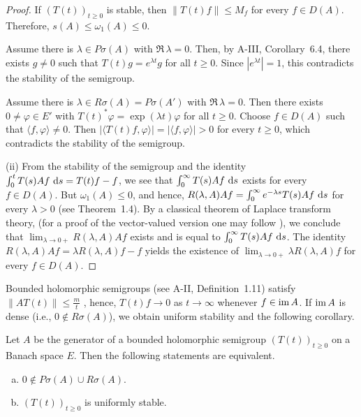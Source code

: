 \begin{proof} If \( (T(t))_{t \geq 0} \) is stable, then \( \|T(t) f\| \leq M_f \) for every \( f \in D(A) \). Therefore, \( s(A) \leq \omega_1(A) \leq 0 \). 

\noindent Assume there is \( \lambda \in P\sigma(A) \) with \( \Re\,\lambda = 0 \). Then, by A-III, Corollary~6.4, there exists \( g \neq 0 \) such that \( T(t) g = e^{\lambda t} g \) for all \( t \geq 0 \). Since \( |e^{\lambda t}| = 1 \), this contradicts the stability of the semigroup. 

\noindent Assume there is \( \lambda \in R\sigma(A) = P\sigma(A') \) with \( \Re\,\lambda = 0 \). Then there exists \( 0 \neq \varphi \in E' \) with \( T(t)^* \varphi = \exp(\lambda t) \varphi \) for all \( t \geq 0 \). Choose \( f \in D(A) \) such that \( \langle f, \varphi \rangle \neq 0 \). Then \( |\langle T(t) f, \varphi \rangle| = | \langle f, \varphi \rangle| > 0 \) for every \( t \geq 0 \), which contradicts the stability of the semigroup.

\medskip
\noindent
(ii) From the stability of the semigroup and the identity   \(\int_{0}^{t} T(s) A f \,\mathop{}\!\mathrm{d}{s} = T(t) f - f\), we see that  
\(\int_{0}^{\infty} T(s) A f \,\mathop{}\!\mathrm{d}{s}\) exists for every \( f \in D(A) \).  
But \( \omega_1(A) \leq 0 \), and hence,  
\( R(\lambda, A) A f = \int_{0}^{\infty} e^{-\lambda s} T(s) A f \,\mathop{}\!\mathrm{d}{s} \) for every \( \lambda > 0 \) (see Theorem~1.4). By a classical theorem of Laplace transform theory, (for a proof of the vector-valued version one may follow \citet[p.196]{widder:1971}), we conclude that $\lim_{\lambda \to 0+} R(\lambda,A)Af$ exists
and is equal to $\int_{0}^{\infty} T(s)Af \,\mathop{}\!\mathrm{d}{s}$. 
The identity $R(\lambda,A)Af = \lambda R(\lambda,A)f - f$
yields the existence of $\lim_{\lambda \to 0+} \lambda R(\lambda,A)f$ for every $f \in D(A)$.
\end{proof}
\noindent
Bounded holomorphic semigroups (see A-II, Definition~1.11) satisfy
$\|AT(t)\| \leq \frac{m}{t}$ \citet[p.33]{goldstein:1985a}, hence, $T(t)f \to 0$ as $t \to \infty$
whenever $f \in \mathop{}\!\mathrm{im}\, A$. 
If $\mathop{}\!\mathrm{im}\, A$ is dense (i.e., $0 \not\in R\sigma(A)$), we obtain
uniform stability and the following corollary.

\begin{corollary}\label{cor:a4-1.14}
Let $A$ be the generator of a bounded holomorphic
semigroup $(T(t))_{t \geq 0}$ on a Banach space $E$. 
Then the following statements are equivalent.
\begin{enumerate}[(a)]
\item $0 \not\in P\sigma(A) \cup R\sigma(A)$.
\item $(T(t))_{t \geq 0}$ is uniformly stable.
\end{enumerate}
\end{corollary}

